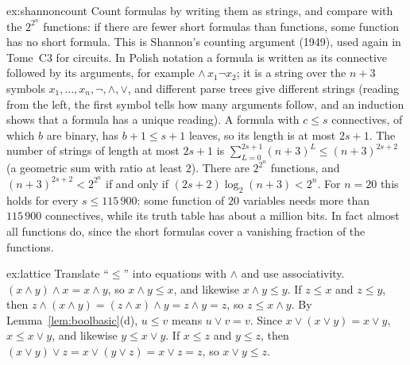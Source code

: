 \begin{solution}{ex:shannoncount}
\idea Count formulas by writing them as strings, and compare with the $2^{2^n}$ functions: if there are fewer short formulas
than functions, some function has no short formula. This is Shannon's counting argument (1949), used again in Tome~C3
for circuits.
\writeup In Polish notation a formula is written as its connective followed by its arguments, for example $\land\,x_1\neg x_2$; it is a
string over the $n+3$ symbols $x_1,\dots,x_n,\neg,\land,\lor$, and different parse trees give different strings (reading from the
left, the first symbol tells how many arguments follow, and an induction shows that a formula has a unique reading).
A formula with $c\le s$ connectives, of which $b$ are binary, has $b+1\le s+1$ leaves, so its length is at most $2s+1$. The number of
strings of length at most $2s+1$ is $\sum_{L=0}^{2s+1}(n+3)^L\le(n+3)^{2s+2}$ (a geometric sum with ratio at least $2$). There are $2^{2^n}$
functions, and $(n+3)^{2s+2}<2^{2^n}$ if and only if $(2s+2)\log_2(n+3)<2^n$. For $n=20$ this holds for every $s\le115\,900$: some
function of $20$ variables needs more than $115\,900$ connectives, while its truth table has about a million bits. In
fact almost all functions do, since the short formulas cover a vanishing fraction of the functions.
\end{solution}

\begin{solution}{ex:lattice}
\idea Translate ``$\le$'' into equations with $\land$ and use associativity.
\writeup $(x\land y)\land x=x\land y$, so $x\land y\le x$, and likewise $x\land y\le y$. If $z\le x$ and $z\le y$, then $z\land(x\land y)=(z\land x)\land y=z\land y=z$, so
$z\le x\land y$. By Lemma~\ref{lem:boolbasic}(d), $u\le v$ means $u\lor v=v$. Since $x\lor(x\lor y)=x\lor y$, $x\le x\lor y$, and likewise $y\le x\lor y$. If $x\le z$
and $y\le z$, then $(x\lor y)\lor z=x\lor(y\lor z)=x\lor z=z$, so $x\lor y\le z$.
\end{solution}


